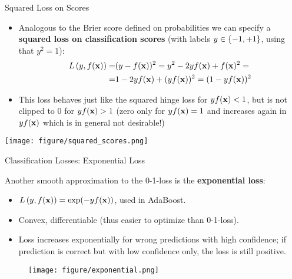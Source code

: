 \documentclass[11pt,compress,t,notes=noshow, xcolor=table]{beamer}
\begin{document}
\begin{vbframe}{Squared Loss on Scores}


\begin{itemize}
  \item Analogous to the Brier score defined on probabilities we can specify a 
  \textbf{squared loss on classification scores} (with labels $y \in \{-1, +1\}$, using 
  that $y^2 = 1$):
  \begin{eqnarray*}
  L\left(y, f(\mathbf{x})\right) = &(y - f(\mathbf{x}))^2 = y^2 - 2yf(\mathbf{x}) + f(\mathbf{x})^2 =\\
  = &1 - 2yf(\mathbf{x}) + (yf(\mathbf{x}))^2 = (1 - yf(\mathbf{x}))^2
  \end{eqnarray*}
  \item This loss behaves just like the squared hinge loss for $yf(\mathbf{x}) < 1$, but is not clipped to $0$ for $yf(\mathbf{x})>1$ (zero only for $yf(\mathbf{x}) = 1$ and increases again in $yf(\mathbf{x})$ which is in general not desirable!)
\end{itemize}

\begin{center}
\texttt{[image: figure/squared\_scores.png]}
\end{center}

\end{vbframe}



\begin{vbframe}{Classification Losses: Exponential Loss}

Another smooth 
approximation to the 0-1-loss is the \textbf{exponential loss}:
\begin{itemize}
\item $L\left(y, f(\mathbf{x})\right) = \exp(-yf(\mathbf{x}))$, used in AdaBoost.
\item Convex, differentiable (thus easier to optimize than 0-1-loss).
\item Loss increases exponentially for wrong predictions with high confidence; if prediction is correct but with low confidence only, the loss is still positive.
\end{itemize}


\begin{figure}
\texttt{[image: figure/exponential.png]}
\end{figure}

\end{vbframe}
\end{document}
